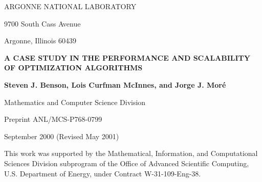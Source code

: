 
\vspace{1.75in}

\begin{center}

ARGONNE NATIONAL LABORATORY

9700 South Cass Avenue

Argonne, Illinois  60439

\vspace{1.5in}

{\large
{\bf 
A CASE STUDY IN THE PERFORMANCE AND SCALABILITY OF
OPTIMIZATION ALGORITHMS
}
}

\vspace{.5in}

{\bf Steven J. Benson,
Lois Curfman McInnes, and
Jorge J. Mor\'e}

\vspace{.5in}

Mathematics and Computer Science Division

\vspace{.25in}

Preprint ANL/MCS-P768-0799

\vspace{.5in}

September 2000 (Revised May 2001)
\end{center}

\vspace{2.5in}

\bigskip


\par\noindent
This work was supported by the Mathematical, Information, and
Computational Sciences Division subprogram of the Office of Advanced
Scientific Computing, U.S. Department of Energy, under Contract
W-31-109-Eng-38.
